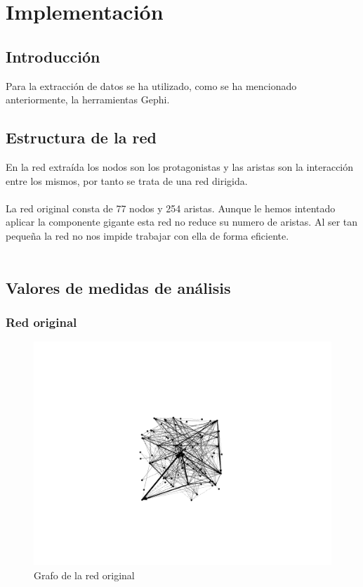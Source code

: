 \chapter{Implementación}

\section{Introducción}
\label{sec:intro}

Para la extracción de datos se ha utilizado, como se ha mencionado anteriormente, la herramientas Gephi.

\section{Estructura de la red}

En la red extraída los nodos son los protagonistas y las aristas son la interacción entre los mismos, por tanto se trata de una red dirigida.
\\ \\
La red original consta de 77 nodos y 254 aristas. Aunque le hemos intentado aplicar la componente gigante esta red no reduce su numero de aristas. Al ser tan pequeña la red no nos impide trabajar con ella de forma eficiente.
\\ \\

\section{Valores de medidas de análisis}
\label{sec:medidas}

\subsection{Red original}

\begin{figure}[H]
	\centering
	\includegraphics[width=12cm]{../images/original-graph}
	\caption{Grafo de la red original}
\end{figure}

